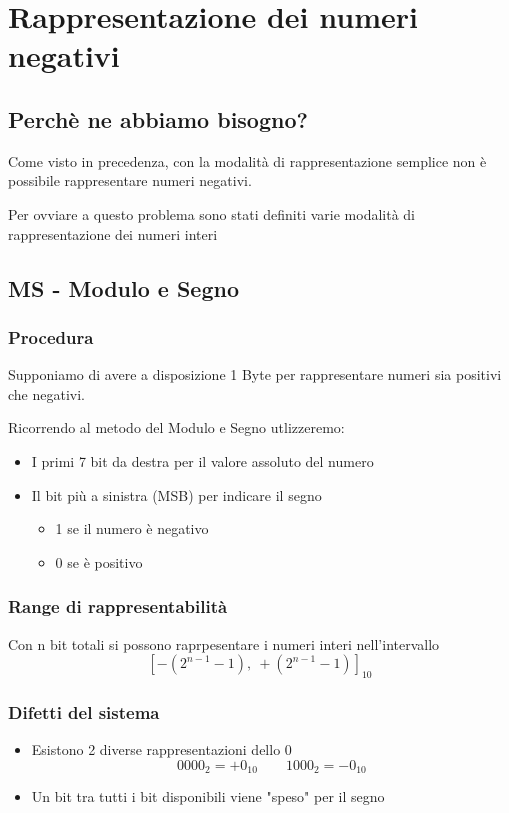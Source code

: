 \chapter{Rappresentazione dei numeri negativi}
\section{Perchè ne abbiamo bisogno?}
Come visto in precedenza, con la modalità di rappresentazione semplice non è possibile rappresentare numeri negativi.

Per ovviare a questo problema sono stati definiti varie modalità di rappresentazione dei numeri interi

\section{MS - Modulo e Segno}
\subsection{Procedura}
Supponiamo di avere a disposizione 1 Byte per rappresentare numeri sia positivi che negativi.

Ricorrendo al metodo del Modulo e Segno utlizzeremo:
\begin{itemize}
    \item I primi 7 bit da destra per il valore assoluto del numero
    \item Il bit più a sinistra (MSB) per indicare il segno
    \begin{itemize}
        \item 1 se il numero è negativo
        \item 0 se è positivo
    \end{itemize}
\end{itemize}

\subsection{Range di rappresentabilità}
Con n bit totali si possono raprpesentare i numeri interi nell'intervallo
{\LARGE
$$
    [-(2^{n-1}-1),\ +(2^{n-1}-1)]_{10}
$$
}

\subsection{Difetti del sistema}
\begin{itemize}
    \item Esistono 2 diverse rappresentazioni dello 0 
    {\Large
        $$
        0000_2 = +0_{10} \qquad 1000_{2} = -0_{10}
    $$}
    \item Un bit tra tutti i bit disponibili viene "speso" per il segno
\end{itemize}

